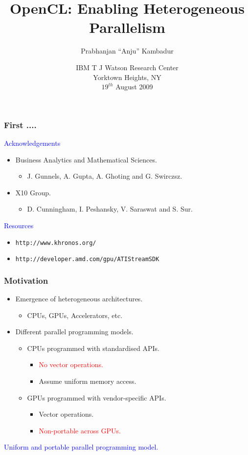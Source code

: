 \documentclass{beamer}
\title{OpenCL: Enabling Heterogeneous Parallelism}
\author{Prabhanjan ``Anju'' Kambadur}
\date{{\small IBM T J Watson Research Center}\\
{\footnotesize Yorktown Heights, NY}\\
$19^{th}$ August 2009}
\newcommand{\code}[1]{\lstinline[basicstyle=\sffamily]{#1}}
\begin{document}
\begin{frame}
  \titlepage
\end{frame}

\begin{frame}
\frametitle{First ....}

  \textcolor{blue}{Acknowledgements}
  \begin{itemize}
  \item Business Analytics and Mathematical Sciences.
    \begin{itemize}
    \item J. Gunnels, A. Gupta, A. Ghoting and G. Swirczsz.
    \end{itemize}
  \item X10 Group.
    \begin{itemize}
    \item D. Cunningham, I. Peshansky, V. Saraswat and S. Sur.
    \end{itemize}
  \end{itemize}

  \textcolor{blue}{Resources}

  \begin{itemize}
  \item \code{http://www.khronos.org/}
  \item \code{http://developer.amd.com/gpu/ATIStreamSDK}
  \end{itemize}

\end{frame}

\begin{frame}
\frametitle{Motivation}
\begin{itemize}
\item Emergence of heterogeneous architectures.
  \begin{itemize}
  \item CPUs, GPUs, Accelerators, etc.
  \end{itemize}
\item Different parallel programming models.
  \begin{itemize}
  \item CPUs programmed with standardised APIs.
    \begin{itemize}
    \item \textcolor{red}{No vector operations.}
    \item Assume uniform memory access.
    \end{itemize}
  \item GPUs programmed with vendor-specific APIs.
    \begin{itemize}
    \item Vector operations.
    \item \textcolor{red}{Non-portable across GPUs.}
    \end{itemize}
  \end{itemize}
\end{itemize}
\begin{center}
\textcolor{blue}{Uniform and portable parallel programming model.}
\end{center}
\end{frame}
\end{document}
